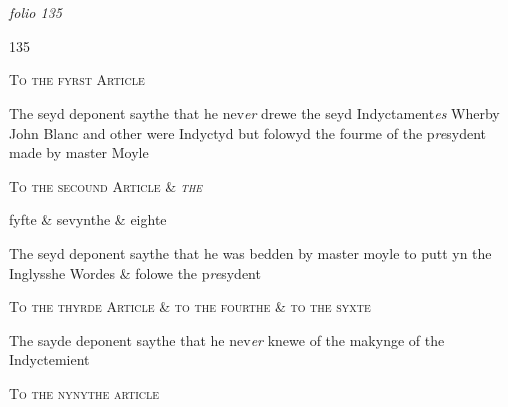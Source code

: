 \documentclass[12pt, a4paper]{book}
\begin{document}
\dotfill
					  \section*{}  \subsection*{}

\textit{folio 135}



\begin{flushright}{\color{Mahogany}135}\end{flushright}
 
 	
				\begin{center}  {\scshape To the fyrst Article}  \end{center}
			
 	
		\ifthenelse{\isodd{\thepage}}
		{\reversemarginpar}
		{\normalmarginpar}
		The seyd deponent saythe that he nev\textit{er} drewe the seyd Indyctament\textit{es} Wherby John Blanc and other were Indyctyd but folowyd the fourme of the p\textit{re}sydent made by master Moyle
            		
				\begin{center}  {\scshape To the secound Article \& 
                  \textit{the}
			
               fyfte \& sevynthe \& eighte}  \end{center}
			
            			
		\ifthenelse{\isodd{\thepage}}
		{\reversemarginpar}
		{\normalmarginpar}
		The seyd deponent saythe that he was bedden by master moyle to putt yn the Inglysshe Wordes \& folowe the p\textit{re}sydent
            		
				\begin{center}  {\scshape To the thyrde Article \& to the fourthe \& to the syxte }  \end{center}
			
            		
		\ifthenelse{\isodd{\thepage}}
		{\reversemarginpar}
		{\normalmarginpar}
		The sayde deponent saythe that he nev\textit{er} knewe of the makynge of the Indyctemient
            		
				\begin{center}  {\scshape To the nynythe article}  \end{center}
			
\end{document}
